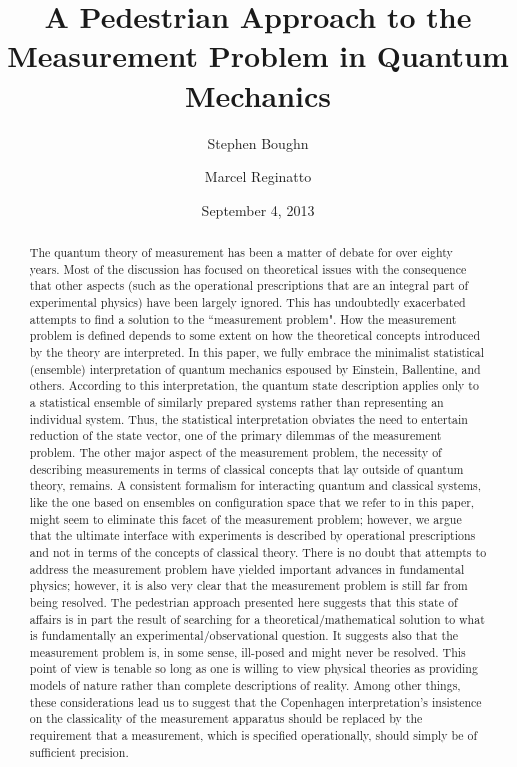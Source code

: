 \documentclass [12pt]{revtex4}
\begin{document}
\title{A Pedestrian Approach to the Measurement Problem in Quantum Mechanics}

\author{Stephen Boughn}


\author{Marcel Reginatto}
\address{Physikalisch-Technische Bundesanstalt, Braunschweig, Germany}

\date{September 4, 2013}

\begin{abstract}

The quantum theory of measurement has been a matter of debate for
over eighty years. Most of the discussion has focused on theoretical
issues with the consequence that other aspects (such as the
operational prescriptions that are an integral part of experimental
physics) have been largely ignored. This has undoubtedly exacerbated
attempts to find a solution to the ``measurement problem". How the
measurement problem is defined depends to some extent on how the theoretical
concepts introduced by the theory are interpreted. In this paper, we
fully embrace the minimalist statistical (ensemble) interpretation
of quantum mechanics espoused by Einstein, Ballentine, and others.
According to this interpretation, the quantum state description
applies only to a statistical ensemble of similarly prepared systems
rather than representing an individual system. Thus, the statistical
interpretation obviates the need to entertain reduction of the state
vector, one of the primary dilemmas of the measurement problem. The
other major aspect of the measurement problem, the necessity of
describing measurements in terms of classical concepts that lay
outside of quantum theory, remains. A consistent formalism
for interacting quantum and classical systems, like the
one based on ensembles on configuration space that we
refer to in this paper, might seem to eliminate this facet of the
measurement problem; however, we argue that the ultimate interface
with experiments is described by operational prescriptions and not in terms of the concepts of classical theory. There is no doubt that attempts to address the measurement problem have
yielded important advances in fundamental physics;
however, it is also very clear that the measurement problem
is still far from being resolved.  The pedestrian approach presented here
suggests that this state of affairs is in part the result of searching for a
theoretical/mathematical solution to what is fundamentally an
experimental/observational question.  It suggests also that the measurement problem is, in some sense, ill-posed and
might never be resolved.  This point of view is tenable so long as one
is willing to view physical theories as providing models of nature
rather than complete descriptions of reality. Among other things,
these considerations lead us to suggest that the Copenhagen
interpretation's insistence on the classicality of the measurement
apparatus should be replaced by the requirement that a measurement,
which is specified operationally, should simply be of sufficient
precision.
\end{abstract}
\end{document}
